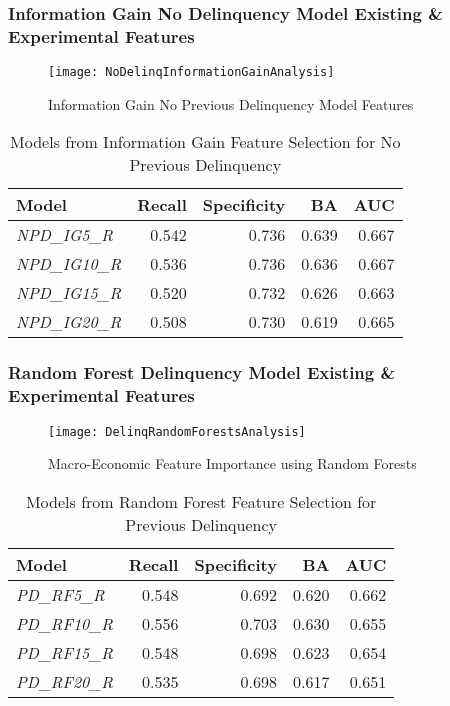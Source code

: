 \subsubsection{Information Gain No Delinquency Model Existing \& Experimental Features}

\begin{figure}[H]
	\texttt{[image: NoDelinqInformationGainAnalysis]}
	\caption{Information Gain No Previous Delinquency Model Features}
	\label{fig:NoDelinqInformationGainAnalysis}
\end{figure}


\begin{table}[H]
\centering
\small
		\begin{tabular}{l r r r r}
			\hline
			\textbf{Model} & \textbf{Recall} & \textbf{Specificity} & \textbf{BA} & \textbf{AUC}  \\ \hline
			\textit{NPD\_IG5\_R} & 0.542 & 0.736 & 0.639 & 0.667   \\ 
			\textit{NPD\_IG10\_R} & 0.536 & 0.736 & 0.636 & 0.667  \\ 
			\textit{NPD\_IG15\_R} & 0.520 & 0.732 & 0.626 & 0.663 \\
			\textit{NPD\_IG20\_R} &  0.508 & 0.730 & 0.619 & 0.665  \\\hline 
		\end{tabular}
	\caption{Models from Information Gain Feature Selection for No Previous Delinquency}
	\label{table:InfoGainNPDModelResults}
\end{table}

\subsubsection{Random Forest Delinquency Model Existing \& Experimental Features}

\begin{figure}[H]
	\texttt{[image: DelinqRandomForestsAnalysis]}
	\caption{Macro-Economic Feature Importance using Random Forests}
	\label{fig:DelinqRandomForestsAnalysis}
\end{figure}

\begin{table}[H]
\centering
\small
		\begin{tabular}{l r r r r}
			\hline
			\textbf{Model} & \textbf{Recall} & \textbf{Specificity} & \textbf{BA} & \textbf{AUC}  \\ \hline
			\textit{PD\_RF5\_R} & 0.548 & 0.692 & 0.620 & 0.662   \\ 
			\textit{PD\_RF10\_R} & 0.556 & 0.703 & 0.630 & 0.655  \\ 
			\textit{PD\_RF15\_R} & 0.548 & 0.698 & 0.623 & 0.654  \\
			\textit{PD\_RF20\_R} & 0.535 & 0.698 & 0.617 & 0.651  \\\hline 
		\end{tabular}

	\caption{Models from Random Forest Feature Selection for Previous Delinquency}
	\label{table:RFPDModelResults}
\end{table}



